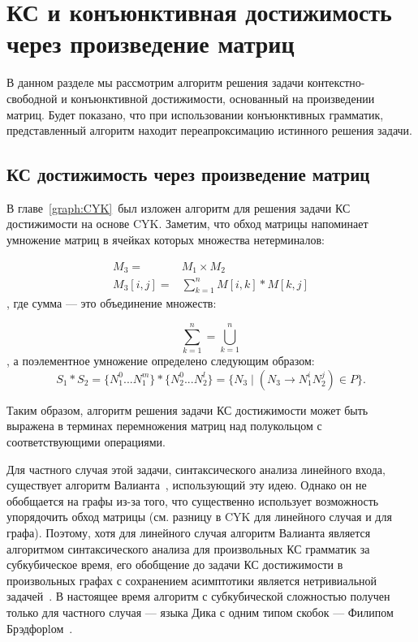 \chapter{КС и конъюнктивная достижимость через произведение матриц}\label{chpt:MatrixBasedAlgos}

В данном разделе мы рассмотрим алгоритм решения задачи контекстно-свободной и конъюнктивной достижимости, основанный на произведении матриц. Будет показано, что при использовании конъюнктивных грамматик, представленный алгоритм находит переапроксимацию истинного решения задачи.

\section{КС достижимость через произведение матриц}
\label{Matrix-CFPQ}
В главе~\ref{graph:CYK}~был изложен алгоритм для решения задачи КС достижимости на основе CYK. Заметим, что обход матрицы напоминает умножение матриц в ячейках которых множества нетерминалов:

\begin{align*}
M_3 = &M_1 \times M_2 \\
M_3[i,j] = &\sum_{k=1}^{n} M[i,k] * M[k,j]
\end{align*}
, где сумма --- это объединение множеств:

$$
\sum_{k=1}^{n} = \bigcup_{k=1}^{n}
$$
, а поэлементное умножение определено следующим образом:
$$
S_1 * S_2 = \{N_1^0 ... N_1^m\} * \{N_2^0 ... N_2^l\} = \{N_3 \mid (N_3 \rightarrow N_1^i N_2^j) \in P\}.
$$

Таким образом, алгоритм решения задачи КС достижимости может быть выражена в терминах перемножения матриц над полукольцом с соответствующими операциями.

Для частного случая этой задачи, синтаксического анализа линейного входа, существует алгоритм Валианта~\cite{Valiant:1975:GCR:1739932.1740048}, использующий эту идею.
Однако он не обобщается на графы из-за того, что существенно использует возможность упорядочить обход матрицы (см. разницу в CYK для линейного случая и для графа).
Поэтому, хотя для линейного случая алгоритм Валианта является алгоритмом синтаксического анализа для произвольных КС грамматик за субкубическое время, его обобщение до задачи КС достижимости в произвольных графах с сохранением асимптотики является нетривиальной задачей~\cite{Yannakakis}.
В настоящее время алгоритм с субкубической сложностью получен только для частного случая --- языка Дика с одним типом скобок --- Филипом Брэдфорlом~\cite{8249039}.


